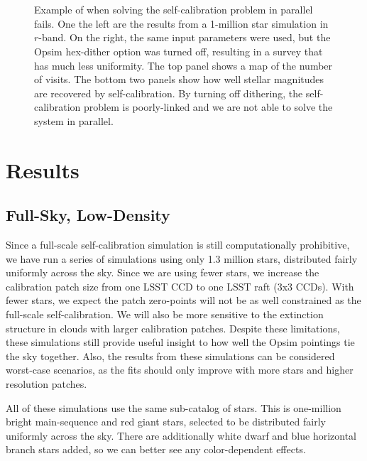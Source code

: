 \documentclass[12pt,preprint]{aastex}
\begin{document}
\begin{figure}
\\
\\
\caption{Example of when solving the self-calibration problem in parallel fails.  One the left are the results from a 1-million star simulation in $r$-band.  On the right, the same input parameters were used, but the Opsim hex-dither option was turned off, resulting in a survey that has much less uniformity.  The top panel shows a map of the number of visits.  The bottom two panels show how well stellar magnitudes are recovered by self-calibration.  By turning off dithering, the self-calibration problem is poorly-linked and we are not able to solve the system in parallel.  \label{fig:nodither}}
\end{figure}






\section{Results}



\subsection{Full-Sky, Low-Density}\label{sec:fsld}

Since a full-scale self-calibration simulation is still computationally prohibitive, we have run a series of simulations using only 1.3 million stars, distributed fairly uniformly across the sky.  Since we are using fewer stars, we increase the calibration patch size from one LSST CCD to one LSST raft (3x3 CCDs).  With fewer stars, we expect the patch zero-points will not be as well constrained as the full-scale self-calibration.  We will also be more sensitive to the extinction structure in clouds with larger calibration patches.  Despite these limitations, these simulations still provide useful insight to how well the Opsim pointings tie the sky together.  Also, the results from these simulations can be considered worst-case scenarios, as the fits should only improve with more stars and higher resolution patches.


All of these simulations use the same sub-catalog of stars.  This is one-million bright main-sequence and red giant stars, selected to be distributed fairly uniformly across the sky.  There are additionally white dwarf and blue horizontal branch stars added, so we can better see any color-dependent effects.
\end{document}
